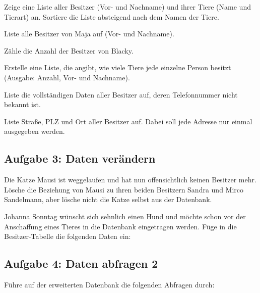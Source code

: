 \begin{compactenum}[a)]
\item Zeige eine Liste aller Besitzer (Vor- und Nachname) und ihrer Tiere (Name
und Tierart) an. Sortiere die Liste absteigend nach dem Namen der Tiere.

\item Liste alle Besitzer von Maja auf (Vor- und Nachname).

\item Zähle die Anzahl der Besitzer von Blacky.

\item Erstelle eine Liste, die angibt, wie viele Tiere jede einzelne Person
besitzt (Ausgabe: Anzahl, Vor- und Nachname).

\item Liste die vollständigen Daten aller Besitzer auf, deren Telefonnummer
nicht bekannt ist.

\item Liste Straße, PLZ und Ort aller Besitzer auf. Dabei soll jede Adresse nur
 einmal ausgegeben werden.
\end{compactenum}

\subsection{Aufgabe 3: Daten verändern}
\begin{compactenum}[a)]
\item Die Katze Mausi ist weggelaufen und hat nun offensichtlich keinen Besitzer
 mehr. Lösche die Beziehung von Mausi zu ihren beiden Besitzern Sandra und
 Mirco Sandelmann, aber lösche nicht die Katze selbst aus der Datenbank.
\item Johanna Sonntag wünscht sich sehnlich einen Hund und möchte schon vor der
 Anschaffung eines Tieres in die Datenbank eingetragen werden. Füge in die
 Besitzer-Tabelle die folgenden Daten ein:\\
\end{compactenum}

\subsection{Aufgabe 4: Daten abfragen 2}

Führe auf der erweiterten Datenbank die folgenden Abfragen durch:

